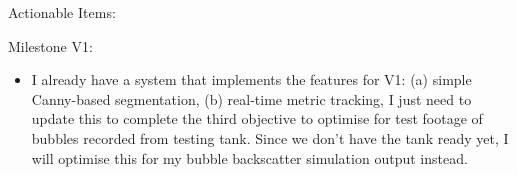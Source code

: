 Actionable Items:

\item Milestone V1:
\begin{itemize}
    \item I already have a system that implements the features for V1: (a) simple Canny-based segmentation, (b) real-time metric tracking, I just need to update this to complete the third objective to optimise for test footage of bubbles recorded from testing tank. Since we don't have the tank ready yet, I will optimise this for my bubble backscatter simulation output instead.
\end{itemize}
